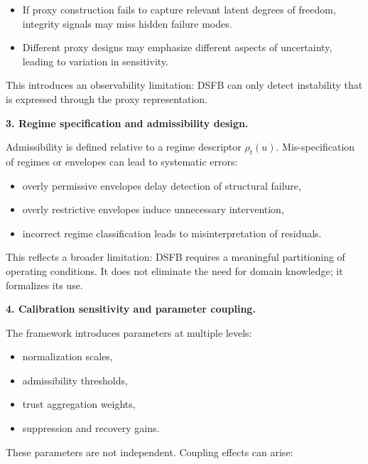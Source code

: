 \documentclass[11pt]{article}
\theoremstyle{definition}
\theoremstyle{plain}
\begin{document}
\begin{itemize}[leftmargin=1.5em]
    \item If proxy construction fails to capture relevant latent degrees of freedom, integrity signals may miss hidden failure modes.
    \item Different proxy designs may emphasize different aspects of uncertainty, leading to variation in sensitivity.
\end{itemize}

This introduces an observability limitation: DSFB can only detect instability that is expressed through the proxy representation.

\vspace{0.5em}
\noindent
\textbf{3. Regime specification and admissibility design.}

Admissibility is defined relative to a regime descriptor $\rho_t(u)$. Mis-specification of regimes or envelopes can lead to systematic errors:

\begin{itemize}[leftmargin=1.5em]
    \item overly permissive envelopes delay detection of structural failure,
    \item overly restrictive envelopes induce unnecessary intervention,
    \item incorrect regime classification leads to misinterpretation of residuals.
\end{itemize}

This reflects a broader limitation: DSFB requires a meaningful partitioning of operating conditions. It does not eliminate the need for domain knowledge; it formalizes its use.

\vspace{0.5em}
\noindent
\textbf{4. Calibration sensitivity and parameter coupling.}

The framework introduces parameters at multiple levels:

\begin{itemize}[leftmargin=1.5em]
    \item normalization scales,
    \item admissibility thresholds,
    \item trust aggregation weights,
    \item suppression and recovery gains.
\end{itemize}

These parameters are not independent. Coupling effects can arise:
\end{document}
